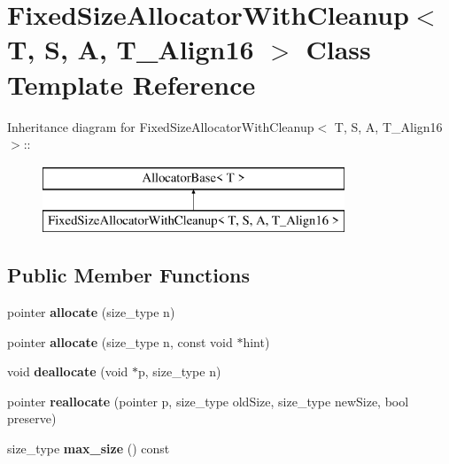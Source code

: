 \hypertarget{class_fixed_size_allocator_with_cleanup}{
\section{FixedSizeAllocatorWithCleanup$<$ T, S, A, T\_\-Align16 $>$ Class Template Reference}
\label{class_fixed_size_allocator_with_cleanup}
}
Inheritance diagram for FixedSizeAllocatorWithCleanup$<$ T, S, A, T\_\-Align16 $>$::\begin{figure}[H]
\begin{center}
\leavevmode
\includegraphics[height=2cm]{class_fixed_size_allocator_with_cleanup}
\end{center}
\end{figure}
\subsection*{Public Member Functions}
\begin{DoxyCompactItemize}
\item 
\hypertarget{class_fixed_size_allocator_with_cleanup_a53845df92db620ab0ae7ee5bc3d8b132}{
pointer {\bfseries allocate} (size\_\-type n)}
\label{class_fixed_size_allocator_with_cleanup_a53845df92db620ab0ae7ee5bc3d8b132}

\item 
\hypertarget{class_fixed_size_allocator_with_cleanup_ae7428063aa172483e630bc370a0188e5}{
pointer {\bfseries allocate} (size\_\-type n, const void $\ast$hint)}
\label{class_fixed_size_allocator_with_cleanup_ae7428063aa172483e630bc370a0188e5}

\item 
\hypertarget{class_fixed_size_allocator_with_cleanup_a0d2ebc799d0efcb6d45c3cefc55a524f}{
void {\bfseries deallocate} (void $\ast$p, size\_\-type n)}
\label{class_fixed_size_allocator_with_cleanup_a0d2ebc799d0efcb6d45c3cefc55a524f}

\item 
\hypertarget{class_fixed_size_allocator_with_cleanup_a9068b6b8abec42a6c02f6fb7db5d3a03}{
pointer {\bfseries reallocate} (pointer p, size\_\-type oldSize, size\_\-type newSize, bool preserve)}
\label{class_fixed_size_allocator_with_cleanup_a9068b6b8abec42a6c02f6fb7db5d3a03}

\item 
\hypertarget{class_fixed_size_allocator_with_cleanup_af88fcb356bb10faa615fa2572b724b5f}{
size\_\-type {\bfseries max\_\-size} () const }
\label{class_fixed_size_allocator_with_cleanup_af88fcb356bb10faa615fa2572b724b5f}

\end{DoxyCompactItemize}
